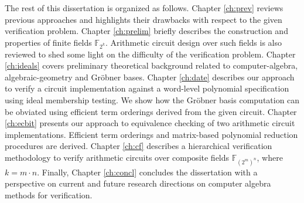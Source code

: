 The rest of this dissertation is organized as follows.  Chapter
\ref{ch:prev} reviews previous approaches and highlights their
drawbacks with respect to the given verification problem. 
Chapter \ref{ch:prelim} briefly describes the construction and
properties of finite fields $\mathbb{F}_{2^k}$. Arithmetic circuit
design over such fields is also reviewed to shed some light on the
difficulty of the verification problem. Chapter \ref{ch:ideals} covers
preliminary theoretical background related to %
computer-algebra, algebraic-geometry and Gr\"obner bases. Chapter
\ref{ch:date} describes our approach to verify a circuit implementation
against a word-level polynomial specification using ideal membership
testing. We show how the Gr\"obner basis computation can be obviated
using efficient term orderings derived from the given circuit. 
Chapter \ref{ch:ecbit} presents our approach to equivalence
checking of two arithmetic circuit implementations. Efficient term
orderings and matrix-based polynomial reduction procedures are
derived. Chapter \ref{ch:cf} describes a hierarchical verification
methodology to verify arithmetic circuits over composite fields
$\mathbb{F}_{(2^m)^{n}}$, where $k=m \cdot n$.  Finally, Chapter
\ref{ch:concl} concludes the dissertation with a perspective on
current and future research directions on computer algebra methods for
verification.  

